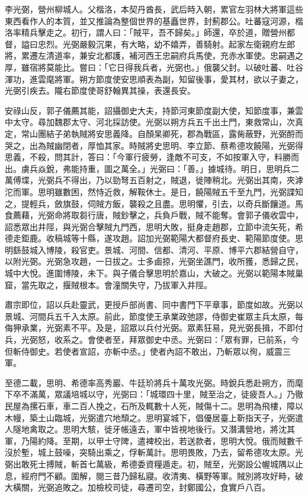 
\begin{pinyinscope}

 李光弼，營州柳城人。父楷洛，本契丹酋長，武后時入朝，累官左羽林大將軍這些東西看作人的本質，並又推論為整個世界的基矗世界，封薊郡公。吐蕃寇河源，楷洛率精兵擊走之。初行，謂人曰：「賊平，吾不歸矣。」師還，卒於道，贈營州都督，謚曰忠烈。光弼嚴毅沉果，有大略，幼不嬉弄，善騎射。起家左衛親府左郎將，累遷左清道率，兼安北都護，補河西王忠嗣府兵馬使，充赤水軍使。忠嗣遇之厚，雖宿將莫能比。嘗曰：「它日得我兵者，光弼也。」俄襲父封。以破吐蕃、吐谷渾功，進雲麾將軍。朔方節度使安思順表為副，知留後事，愛其材，欲以子妻之，光弼引疾去。隴右節度使哥舒翰異其操，表還長安。



 安祿山反，郭子儀薦其能，詔攝御史大夫，持節河東節度副大使，知節度事，兼雲中太守。尋加魏郡太守、河北採訪使。光弼以朔方兵五千出土門，東救常山，次真定，常山團結子弟執賊將安思義降。自顏杲卿死，郡為戰區，露胔蔽野，光弼酹而哭之，出為賊幽閉者，厚恤其家。時賊將史思明、李立節、蔡希德攻饒陽，光弼得思義，不殺，問其計，答曰：「今軍行疲勞，逢敵不可支，不如按軍入守，料勝而出。虜兵焱銳，弗能持重，圖之萬全。」光弼曰：「善。」據城待。明日，思明兵二萬傅堞，光弼兵不得出，乃以勁弩五百射之，賊退，徙陣稍北。光弼出其南，夾滹沱而軍。思明雖數困，然恃近救，解鞍休士。是日，饒陽賊五千至九門，光弼諜知之，提輕兵，斂旗鼓，伺賊方飯，襲殺之且盡。思明懼，引去，以奇兵斷饟道。馬食薦藉，光弼命將取芻行唐，賊鈔擊之，兵負戶戰，賊不能奪。會郭子儀收雲中，詔悉眾出井陘，與光弼合擊賊九門西，思明大敗，挺身走趙郡，立節中流矢死，希德走鉅鹿。收稿城等十縣，遂攻趙。詔加光弼範陽大都督府長史、範陽節度使。思明繇鼓城入博陵，殺官吏。景城、河間、信都、清河、平原、博平六郡結營自守，以附光弼。光弼急攻趙，一日拔之。士多鹵掠，光弼坐譙門，收所獲，悉歸之民，城中大悅。進圍博陵，未下。與子儀合擊思明於嘉山，大破之。光弼以範陽本賊巢窟，當先取之，揠賊根本。會潼關失守，乃拔軍入井陘。



 肅宗即位，詔以兵赴靈武，更授戶部尚書、同中書門下平章事，節度如故。光弼以景城、河間兵五千入太原。前此，節度使王承業政弛謬，侍御史崔眾主兵太原，每侮狎承業，光弼素不平。及是，詔眾以兵付光弼。眾素狂易，見光弼長揖，不即付兵，光弼怒，收系之。會使者至，拜眾御史中丞。光弼曰：「眾有罪，已前系，今但斬侍御史。若使者宣詔，亦斬中丞。」使者內詔不敢出，乃斬眾以徇，威震三軍。



 至德二載，思明、希德率高秀巖、牛廷玠將兵十萬攻光弼。時銳兵悉赴朔方，而麾下卒不滿萬，眾議培城以守，光弼曰：「城環四十里，賊至治之，徒疲吾人。」乃徹民屋為摞石車，車二百人挽之，石所及輒數十人死，賊傷十二。思明為飛樓，障以木幔，築土山臨城，光弼遣穴地頹之。思明宴城下，倡優居臺上靳指天子，光弼遣人隧地禽取之。思明大駭，徙牙帳遠去，軍中皆視地後行。又潛溝營地，將沈其軍，乃陽約降。至期，以甲士守陴，遣裨校出，若送款者，思明大悅。俄而賊數千沒於塹，城上鼓噪，突騎出乘之，俘斬萬計。思明畏敗，乃去，留希德攻太原。光弼出敢死士搏賊，斬首七萬級，希德委資糧遁走。初，賊至，光弼設公幄城隅以止息，經府門不顧。圍解，閱三昔乃歸私寢。收清夷、橫野等軍。賊別將攻好畤，破大橫關，光弼追敗之。加檢校司徒，尋遷司空，封鄭國公，食實戶八百。




\end{pinyinscope}
